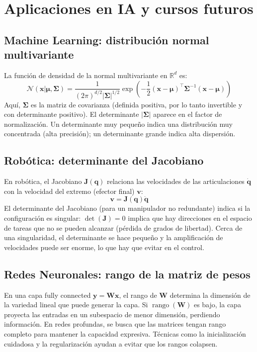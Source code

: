 \documentclass[12pt,a4paper,openany,oneside]{book}
\begin{document}
\section{Aplicaciones en IA y cursos futuros}

\subsection{Machine Learning: distribución normal multivariante}
La función de densidad de la normal multivariante en $\mathbb{R}^d$ es:
\[
\mathcal{N}(\mathbf{x}|\boldsymbol{\mu}, \boldsymbol{\Sigma}) = \frac{1}{(2\pi)^{d/2} |\boldsymbol{\Sigma}|^{1/2}} \exp\left( -\frac{1}{2}(\mathbf{x}-\boldsymbol{\mu})^\top \boldsymbol{\Sigma}^{-1} (\mathbf{x}-\boldsymbol{\mu}) \right)
\]
Aquí, $\boldsymbol{\Sigma}$ es la matriz de covarianza (definida positiva, por lo tanto invertible y con determinante positivo). El determinante $|\boldsymbol{\Sigma}|$ aparece en el factor de normalización. Un determinante muy pequeño indica una distribución muy concentrada (alta precisión); un determinante grande indica alta dispersión.

\subsection{Robótica: determinante del Jacobiano}
En robótica, el Jacobiano $\mathbf{J}(\mathbf{q})$ relaciona las velocidades de las articulaciones $\dot{\mathbf{q}}$ con la velocidad del extremo (efector final) $\mathbf{v}$:
\[
\mathbf{v} = \mathbf{J}(\mathbf{q}) \dot{\mathbf{q}}
\]
El determinante del Jacobiano (para un manipulador no redundante) indica si la configuración es singular: $\det(\mathbf{J}) = 0$ implica que hay direcciones en el espacio de tareas que no se pueden alcanzar (pérdida de grados de libertad). Cerca de una singularidad, el determinante se hace pequeño y la amplificación de velocidades puede ser enorme, lo que hay que evitar en el control.

\subsection{Redes Neuronales: rango de la matriz de pesos}
En una capa fully connected $\mathbf{y} = \mathbf{W}\mathbf{x}$, el rango de $\mathbf{W}$ determina la dimensión de la variedad lineal que puede generar la capa. Si $\operatorname{rango}(\mathbf{W})$ es bajo, la capa proyecta las entradas en un subespacio de menor dimensión, perdiendo información. En redes profundas, se busca que las matrices tengan rango completo para mantener la capacidad expresiva. Técnicas como la inicialización cuidadosa y la regularización ayudan a evitar que los rangos colapsen.
\end{document}
